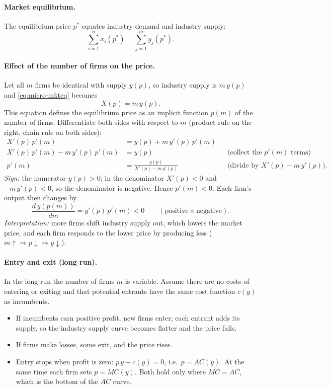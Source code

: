 \paragraph{Market equilibrium.} The equilibrium price $p^*$ equates industry demand and industry supply:
\begin{equation}\label{eq:micro-mkteq}
\sum_{i=1}^{n} x_i(p^*)=\sum_{j=1}^{m} y_j(p^*).
\end{equation}

\paragraph{Effect of the number of firms on the price.} Let all $m$ firms be identical with supply $y(p)$, so industry supply is $m\,y(p)$ and \eqref{eq:micro-mkteq} becomes
\[
X(p)=m\,y(p).
\]
This equation defines the equilibrium price as an implicit function $p(m)$ of the number of firms. Differentiate both sides with respect to $m$ (product rule on the right, chain rule on both sides):
\begin{align*}
X'(p)\,p'(m)&=y(p)+m\,y'(p)\,p'(m) \\
X'(p)\,p'(m)-m\,y'(p)\,p'(m)&=y(p) &&\text{(collect the $p'(m)$ terms)}\\
p'(m)&=\frac{y(p)}{X'(p)-m\,y'(p)} &&\text{(divide by $X'(p)-m\,y'(p)$).}
\end{align*}
\emph{Sign:} the numerator $y(p)>0$; in the denominator $X'(p)<0$ and $-m\,y'(p)<0$, so the denominator is negative. Hence $p'(m)<0$. Each firm's output then changes by
\[
\frac{d\,y(p(m))}{dm}=y'(p)\,p'(m)<0 \qquad(\text{positive}\times\text{negative}).
\]
\emph{Interpretation:} more firms shift industry supply out, which lowers the market price, and each firm responds to the lower price by producing less ($m\uparrow\Rightarrow p\downarrow\Rightarrow y\downarrow$).

\paragraph{Entry and exit (long run).} In the long run the number of firms $m$ is variable. Assume there are no costs of entering or exiting and that potential entrants have the same cost function $c(y)$ as incumbents.
\begin{itemize}
\item If incumbents earn positive profit, new firms enter; each entrant adds its supply, so the industry supply curve becomes flatter and the price falls.
\item If firms make losses, some exit, and the price rises.
\item Entry stops when profit is zero: $p\,y-c(y)=0$, i.e.\ $p=AC(y)$. At the same time each firm sets $p=MC(y)$. Both hold only where $MC=AC$, which is the bottom of the $AC$ curve.
\end{itemize}


